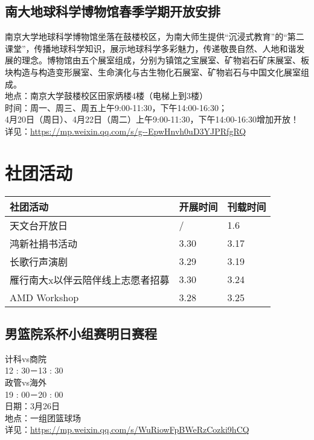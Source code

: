 \documentclass[letterpaper, 12pt]{article}
\begin{document}
\begin{multicols}{2}
\subsection{南大地球科学博物馆春季学期开放安排}
南京大学地球科学博物馆坐落在鼓楼校区，为南大师生提供“沉浸式教育”的“第二课堂”，传播地球科学知识，展示地球科学多彩魅力，传递敬畏自然、人地和谐发展的理念。博物馆由五个展室组成，分别为镇馆之宝展室、矿物岩石矿床展室、板块构造与构造变形展室、生命演化与古生物化石展室、矿物岩石与中国文化展室组成。
\\地点：南京大学鼓楼校区田家炳楼4楼（电梯上到3楼）
\\时间：周一、周三、周五上午9:00-11:30，下午14:00-16:30；
\\4月20日（周日）、4月22日（周二）上午9:00-11:30，下午14:00-16:30增加开放！
\\详见：\url{https://mp.weixin.qq.com/s/g--EpwHnvh0uD3YJPRfgRQ}
\section{社团活动}
\begin{tabular}{|>{\centering\arraybackslash}m{}|m{}|m{}|}
    \hline
    社团活动 & 开展时间 & 刊载时间\\
    \hline\hline
    天文台开放日 & / & 1.6\\
    鸿新社捐书活动 & 3.30 & 3.17\\
    长歌行声演剧 & 3.29 & 3.19\\
    雁行南大x以伴云陪伴线上志愿者招募 & 3.30 & 3.24\\
    AMD Workshop & 3.28 & 3.25\\
    \hline
\end{tabular}
\subsection{男篮院系杯小组赛明日赛程}
计科vs商院
\\12 : 30－13 : 30
\\政管vs海外
\\19 : 00－20 : 00
\\日期：3月26日
\\地点：一组团篮球场
\\详见：\url{https://mp.weixin.qq.com/s/WuRiowFpBWeRzCozki9hCQ}


\end{multicols}
\end{document}

